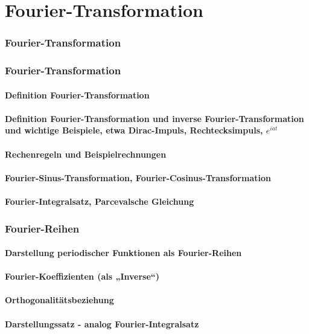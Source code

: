\part{Fourier-Transformation}
\section{Fourier-Transformation}
\section{Fourier-Transformation}
\subsection{Definition Fourier-Transformation}
\subsection{Definition Fourier-Transformation und inverse Fourier-Transformation und wichtige Beispiele, etwa Dirac-Impuls, Rechtecksimpuls, $ e^{iat} $}
\subsection{Rechenregeln und Beispielrechnungen}
\subsection{Fourier-Sinus-Transformation, Fourier-Cosinus-Transformation}
\subsection{Fourier-Integralsatz, Parcevalsche Gleichung}
\section{Fourier-Reihen}
\subsection{Darstellung periodischer Funktionen als Fourier-Reihen}
\subsection{Fourier-Koeffizienten (als „Inverse“)}
\subsection{Orthogonalitätsbeziehung}
\subsection{Darstellungssatz - analog Fourier-Integralsatz}
